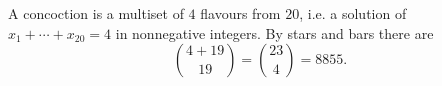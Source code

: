 A concoction is a multiset of $4$ flavours from $20$, i.e. a solution of $x_1+\cdots+x_{20}=4$ in nonnegative integers. By stars and bars there are
\[
\binom{4+19}{19}=\binom{23}{4}=\boxed{8855}.
\]
